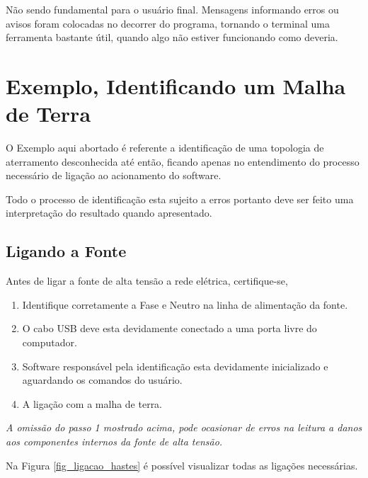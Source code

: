 \documentclass[a4paper, 10pt]{article}
\begin{document}
Não sendo fundamental para o usuário final. Mensagens informando erros ou avisos
foram colocadas no decorrer do programa, tornando o terminal uma ferramenta bastante útil, 
quando algo não estiver funcionando como deveria.

\section{Exemplo, Identificando um Malha de Terra}

O Exemplo aqui abortado é referente a identificação de uma topologia de aterramento
desconhecida até então, ficando apenas no entendimento do processo necessário de 
ligação ao acionamento do software.

Todo o processo de identificação esta sujeito a erros portanto deve ser feito uma 
interpretação do resultado quando apresentado.

\subsection{Ligando a Fonte}

Antes de ligar a fonte de alta tensão a rede elétrica, certifique-se,

\begin{enumerate}
    \item Identifique corretamente a Fase e Neutro na linha de alimentação da fonte.
    \item O cabo USB deve esta devidamente conectado a uma porta livre do computador.
    \item Software responsável pela identificação esta devidamente inicializado e aguardando
        os comandos do usuário.
    \item A ligação com a malha de terra. 
\end{enumerate}

\textit{A omissão do passo 1 mostrado acima, pode ocasionar de erros na leitura a 
danos aos componentes internos da fonte de alta tensão.}

Na Figura \ref{fig_ligacao_hastes} é possível visualizar todas as ligações necessárias.
\end{document}
